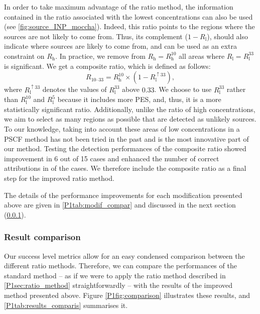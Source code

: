          In order to take maximum advantage of the ratio method, the information contained in the ratio associated with the lowest concentrations can also be used (see \cref{fig:source_INP_moccha}).
         Indeed, this ratio points to the regions where the sources are not likely to come from.
         Thus, its complement ($1-R_\text{l}$), should also indicate where sources are likely to come from, and  can be used as an extra constraint on $R_{\text{h}}$. In practice, we remove from $R_{\text{h}} = R_{\text{h}}^{10}$ all areas where $ R_{\text{l}} = R^{33}_{\text{l}}$ is significant. 
         We get a composite ratio, which is defined as follows:
         \begin{equation}
            R_{\text{10--33}} = R_{\text{h}}^{10} \times (1 - R_{\text{l}}^{\uparrow 33}),
         \end{equation}
         where $R_{\text{l}}^{\uparrow 33}$ denotes the values of $R_{\text{l}}^{33}$ above $0.33$.
         We choose to use $R_{\text{l}}^{33}$ rather than $R_{\text{l}}^{10}$ and $R_{\text{l}}^{5}$ because it includes more PES, and, thus, it is a more statistically significant ratio.
         Additionally, unlike the ratio of high concentrations, we aim to select as many regions as possible that are detected as unlikely sources.
         To our knowledge, taking into account these areas of low concentrations in a PSCF method has not been tried in the past and is the most innovative part of our method.
        Testing the detection performances of the composite ratio showed improvement in 6 out of 15 cases and enhanced the number of correct attributions in  of the cases.
        We therefore include the composite ratio as a final step for the improved ratio method.

        The details of the performance improvements for each modification presented above are given in \cref{P1tab:modif_compar} and discussed in the next section (\cref{P1sec:results_compar}).

    \subsubsection{Result comparison}
    \label{P1sec:results_compar}

        Our success level metrics allow for an easy condensed comparison between the different ratio methods.
        Therefore, we can compare the performances of the standard method -- as if we were to apply the ratio method described in \cref{P1sec:ratio_method} straightforwardly -- with the results of the improved method presented above. Figure \ref{P1fig:comparison} illustrates these results, and \cref{P1tab:results_comparis} summarises it.

